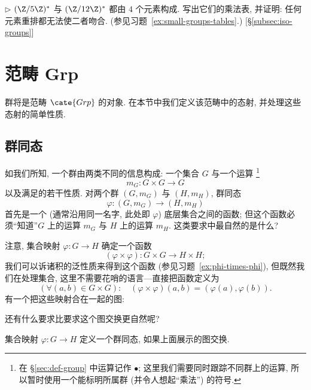 \begin{prob}
\label{ex:c5-c12}
$\triangleright$ $(\Z/5\Z)^{*}$ 与 $(\Z/12\Z)^{*}$ 都由 $4$ 个元素构成. 写出它们的乘法表, 并证明: 任何元素重排都无法使二者吻合. (参见习题~\ref{ex:small-groups-tables}.) [\S\ref{subsec:iso-groups}]
\end{prob}

\section{范畴 Grp}
\label{sec:category-grp}

群将是范畴 $\cate{Grp}$ 的对象. 在本节中我们定义该范畴中的态射, 并处理这些态射的简单性质.

\subsection{群同态}
\label{subsec:group-hom-def}

如我们所知, 一个群由两类不同的信息构成: 一个集合 $G$ 与一个运算%
\footnote{在 \S\ref{sec:def-group} 中运算记作 $\bullet$; 这里我们需要同时跟踪不同群上的运算, 所以暂时使用一个能标明所属群 (并令人想起``乘法'') 的符号.}%
\[
m_G : G \times G \to G
\]
以及满足的若干性质. 对两个群 $(G, m_G)$ 与 $(H, m_H)$, 群同态%
\[
\varphi : (G, m_G) \to (H, m_H)
\]
首先是一个 (通常沿用同一名字, 此处即 $\varphi$) 底层集合之间的函数; 但这个函数必须``知道''$G$ 上的运算 $m_G$ 与 $H$ 上的运算 $m_H$. 这类要求中最自然的是什么?

注意, 集合映射 $\varphi : G \to H$ 确定一个函数
\[
(\varphi \times \varphi) : G \times G \to H \times H;
\]
我们可以诉诸积的泛性质来得到这个函数 (参见习题~\ref{ex:phi-times-phi}), 但既然我们在处理集合, 这里不需要花哨的语言---直接把函数定义为
\[
(\forall (a,b) \in G \times G): \quad (\varphi \times \varphi)(a, b) = (\varphi(a), \varphi(b)).
\]
有一个把这些映射合在一起的图:
\begin{center}
\end{center}
还有什么要求比要求这个图交换更自然呢?

\begin{definition}
\label{def:group-homomorphism}
集合映射 $\varphi : G \to H$ 定义一个群同态, 如果上面展示的图交换.
\end{definition}

